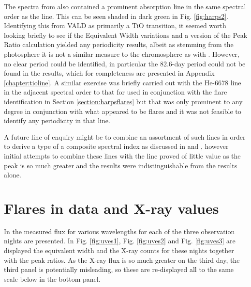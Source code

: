 The spectra from {\harps} also contained a prominent absorption line in the same spectral order as the {\ha} line. This
can be seen shaded in dark green in Fig. \ref{fig:harps2}. Identifying this from VALD as
primarily a TiO transition, it seemed worth looking briefly to see if the Equivalent Width variations and a version of
the Peak Ratio calculation yielded any periodicity results, albeit as stemming from the photosphere it is not a similar
measure to the chromosphere as with \ha. However, no clear period could be identified, in particular the 82.6-day period
could not be found in the results, which for completeness are presented in Appendix \ref{chapter:tioline}. A similar
exercise was briefly carried out with the He-6678 line in the adjacent spectral order to that for {\ha} used in
conjunction with the flare identification in Section \ref{section:harpsflares} but that was only prominent to any degree
in conjunction with what appeared to be flares and it was not feasible to identify any periodicity in that line.

A future line of enquiry might be to combine an assortment of such lines in order to derive a type of a composite
spectral index as discussed in \citet{hall99} and \citet{hall00}, however initial attempts to combine these lines with
the {\ha} line proved of little value as the {\ha} peak is so much greater and the results were indistinguishable from
the {\ha} results alone.

\section{Flares in {\uves} data and X-ray values}
\protect\label{section:uvesflares}

In \citet[fig. 1 to fig. 3]{fuhrmeister11} the measured flux for various wavelengths for each of the three observation
nights are presented. In Fig. \ref{fig:uves1}, Fig. \ref{fig:uves2} and Fig. \ref{fig:uves3} are displayed the {\ha}
equivalent width and the X-ray counts for these nights together with the peak ratios. As the X-ray flux is so much
greater on the third day, the third panel is potentially misleading, so these are re-displayed all to the same scale
below in the bottom panel.

